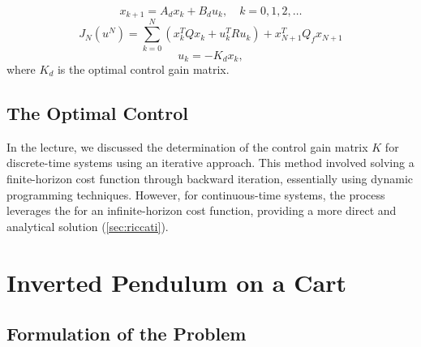 \documentclass[a4 paper]{article}
\begin{document}
\begin{equation}
    x_{k+1} = A_d x_k + B_d u_k, \quad k = 0, 1, 2, \ldots
\end{equation}
\begin{equation}
    J_N(u^N) = \sum_{k=0}^{N} \left( x_k^T Q x_k + u_k^T R u_k \right) + x_{N+1}^T Q_f x_{N+1}
\end{equation}
\begin{equation}
    u_k = -K_d x_k,
\end{equation}
where $K_d$ is the optimal control gain matrix.


\subsection{The Optimal Control}
In the lecture, we discussed the determination of the control gain matrix \( K \) for discrete-time systems using an iterative approach. 
This method involved solving a finite-horizon cost function through backward iteration, essentially using dynamic programming techniques. 
However, for continuous-time systems, the process leverages the  for an infinite-horizon cost function, 
providing a more direct and analytical solution (\ref{sec:riccati}).





\section{Inverted Pendulum on a Cart}

\subsection{Formulation of the Problem}
\end{document}
